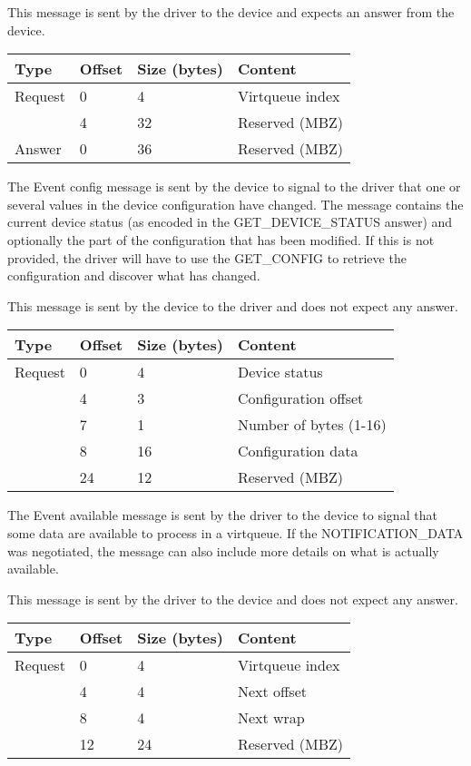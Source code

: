 This message is sent by the driver to the device and expects an answer from the
device.

\begin{tabular}{|l|l|l|l|}
\hline
Type & Offset & Size (bytes) & Content \\
\hline \hline
Request & 0 & 4 & Virtqueue index \\
& 4 & 32 & Reserved (MBZ) \\
\hline
Answer & 0 & 36 & Reserved (MBZ) \\
\hline
\end{tabular}


The Event config message is sent by the device to signal to the driver that one
or several values in the device configuration have changed. The message
contains the current device status (as encoded in the GET\_DEVICE\_STATUS
answer) and optionally the part of the configuration that has been modified. If
this is not provided, the driver will have to use the GET\_CONFIG to retrieve
the configuration and discover what has changed.

This message is sent by the device to the driver and does not expect any
answer.

\begin{tabular}{|l|l|l|l|}
\hline
Type & Offset & Size (bytes) & Content \\
\hline \hline
Request & 0 & 4 & Device status \\
& 4 & 3 & Configuration offset \\
& 7 & 1 & Number of bytes (1-16) \\
& 8 & 16 & Configuration data \\
& 24 & 12 & Reserved (MBZ) \\
\hline
\end{tabular}


The Event available message is sent by the driver to the device to signal that
some data are available to process in a virtqueue. If the NOTIFICATION\_DATA
was negotiated, the message can also include more details on what is actually
available.

This message is sent by the driver to the device and does not expect any
answer.

\begin{tabular}{|l|l|l|l|}
\hline
Type & Offset & Size (bytes) & Content \\
\hline \hline
Request & 0 & 4 & Virtqueue index \\
& 4 & 4 & Next offset \\
& 8 & 4 & Next wrap \\
& 12 & 24 & Reserved (MBZ) \\
\hline
\end{tabular}

